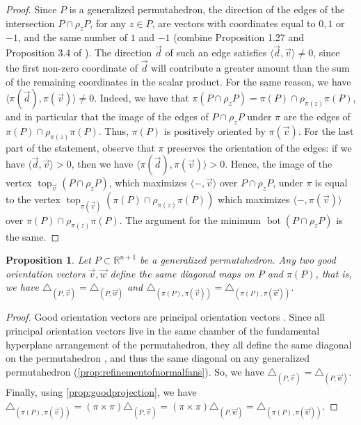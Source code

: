 \documentclass[twoside, 12pt]{amsart}
\newtheorem{proposition}[definition]{Proposition}
\theoremstyle{remark}
\newcommand{\RR}{\mathbb{R}}
\DeclareMathOperator{\tp}{top}
\DeclareMathOperator{\bm}{bot}
\begin{document}
\begin{proof} 
Since $P$ is a generalized permutahedron, the direction of the edges of the intersection $P\cap\rho_z P$, for any $z \in P$, are vectors with coordinates equal to $0,1$ or $-1$, and the same number of $1$ and $-1$ (combine Proposition 1.27 and Proposition 3.4 of \cite{LA21}). 
The direction $\vec d$ of such an edge satisfies $\langle \vec d, \vec v \rangle \neq 0$, since the first non-zero coordinate of $\vec d$ will contribute a greater amount than the sum of the remaining coordinates in the scalar product.  
For the same reason, we have $\langle \pi(\vec d), \pi(\vec v) \rangle \neq 0$. 
Indeed, we have that $\pi(P\cap\rho_z P)=\pi(P)\cap\rho_{\pi(z)}\pi(P)$, and in particular that the image of the edges of $P\cap\rho_z P$ under $\pi$ are the edges of $\pi(P)\cap\rho_{\pi(z)}\pi(P)$. 
Thus, $\pi(P)$ is positively oriented by $\pi(\vec v)$. 
For the last part of the statement, observe that $\pi$ preserves the orientation of the edges: if we have $\langle \vec d, \vec v \rangle >0$, then we have $\langle \pi(\vec d), \pi(\vec v) \rangle > 0$. 
Hence, the image of the vertex $\tp_{\vec v}(P\cap\rho_z P)$, which maximizes $\langle - ,\vec v \rangle$ over $P\cap\rho_z P$, under $\pi$ is equal to the vertex $\tp_{\pi(\vec v)}(\pi(P)\cap\rho_{\pi(z)} \pi(P))$ which maximizes $\langle - ,\pi(\vec v) \rangle$ over $\pi(P)\cap\rho_{\pi(z)} \pi(P)$. The argument for the minimum $\bm(P\cap\rho_z P)$ is the same.
\end{proof}

\begin{proposition}
Let $P\subset\RR^{n+1}$ be a generalized permutahedron. 
Any two good orientation vectors $\vec v, \vec w$ define the same diagonal maps on $P$ and $\pi(P)$, that is, we have $\triangle_{(P,\vec v)}=\triangle_{(P,\vec w)}$ and $\triangle_{(\pi(P),\pi(\vec v))}=\triangle_{(\pi(P),\pi(\vec w))}$.
\end{proposition}
\begin{proof}
Good orientation vectors are principal orientation vectors \cite[Definition 3.15]{LA21}. Since all principal orientation vectors live in the same chamber of the fundamental hyperplane arrangement of the permutahedron, they all define the same diagonal on the permutahedron \cite[Proposition 1.21]{LA21}, and thus the same diagonal on any generalized permutahedron (\cref{prop:refinementofnormalfans}). So, we have $\triangle_{(P,\vec v)}=\triangle_{(P,\vec w)}$. Finally, using \cref{prop:goodprojection}, we have $\triangle_{(\pi(P),\pi(\vec v))}=(\pi \times \pi)\triangle_{(P,\vec v)}=(\pi \times \pi)\triangle_{(P,\vec w)}=\triangle_{(\pi(P),\pi(\vec w))}$. 
\end{proof}
\end{document}
